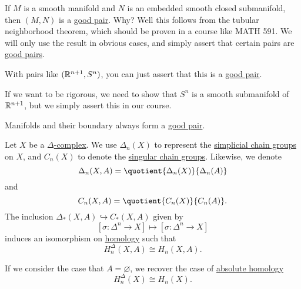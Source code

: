 \begin{remark}
	If \(M\) is a smooth manifold and \(N\) is an embedded smooth closed submanifold, then \((M, N)\) is a \hyperref[def:good-pair]{good pair}.
	Why? Well this follows from the tubular neighborhood theorem, which should be proven in a course like MATH 591. We will only use the result
	in obvious cases, and simply assert that certain pairs are \hyperref[def:good-pair]{good pairs}.
\end{remark}
\begin{eg}
	With pairs like \((\mathbb{\MakeUppercase{r}}^{n + 1}, S^n)\), you can just assert that this is a \hyperref[def:good-pair]{good pair}.
\end{eg}
\begin{explanation}
	If we want to be rigorous, we need to show that \(S^n\) is a smooth submanifold of \(\mathbb{\MakeUppercase{r}}^{n + 1}\),
	but we simply assert this in our course.
\end{explanation}
\begin{eg}
	Manifolds and their boundary always form a \hyperref[def:good-pair]{good pair}.
\end{eg}
\begin{theorem}\label{thm:singular-homology-agrees-with-simplicial-homology}
	Let \(X\) be a \hyperref[def:delta-complex]{\(\Delta\)-complex}. We use \(\Delta_n(X)\) to represent the
	\hyperref[def:simplicial-complex]{simplicial chain groups} on \(X\), and \(C_n(X)\) to denote the
	\hyperref[def:singular-chain-group]{singular chain groups}. Likewise, we denote
	\[
		\Delta_n(X, A) = \quotient{\Delta_n(X)}{\Delta_n(A)}
	\]
	and
	\[
		C_n(X, A) = \quotient{C_n(X)}{C_n(A)}.
	\]
	The inclusion \(\Delta_\ast(X, A) \hookrightarrow C_\ast(X, A)\) given by
	\[
		[\sigma \colon \Delta^n \to X] \mapsto [\sigma : \Delta^n \to X]
	\]
	induces an isomorphism on \hyperref[def:homology-group]{homology} such that
	\[
		H_n^\Delta(X, A) \cong H_n(X, A).
	\]

	If we consider the case that \(A = \varnothing\), we recover the case of \hyperref[def:homology-group]{absolute homology}
	\[
		H_n^\Delta(X) \cong H_n(X).
	\]
\end{theorem}

